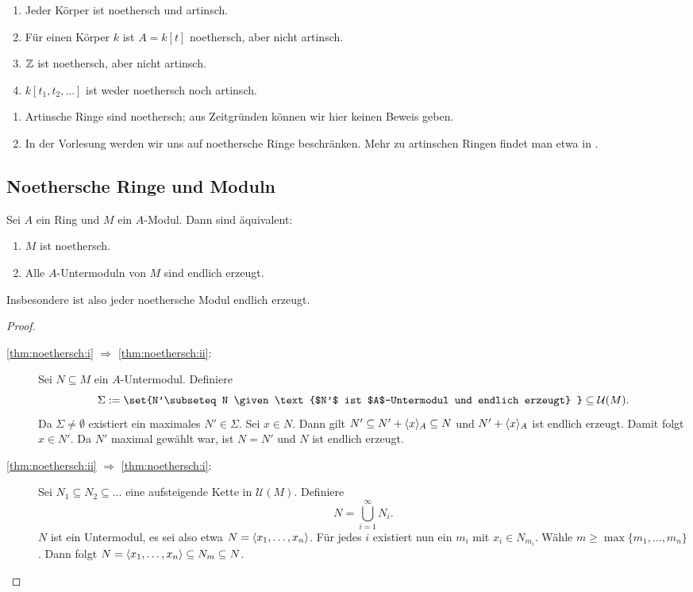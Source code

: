 \documentclass[12pt,a4paper]{scrartcl}
\theoremstyle{cplain}
\theoremstyle{cdef}
\begin{document}
\begin{bsp}
	\leavevmode
	\begin{enumerate}
		\item Jeder Körper ist noethersch und artinsch.
		\item Für einen Körper $k$ ist $A = k[t]$ noethersch, aber nicht artinsch.
		\item $\mathbb Z$ ist noethersch, aber nicht artinsch.
		\item $k[t_1,t_2,\dots]$ ist weder noethersch noch artinsch.
	\end{enumerate}
\end{bsp}
\begin{bem}
	\leavevmode
	\begin{enumerate}
		\item Artinsche Ringe sind noethersch; aus Zeitgründen können wir hier keinen Beweis geben.
		\item In der Vorlesung werden wir uns auf noethersche Ringe beschränken. Mehr zu artinschen Ringen findet man etwa in \cite[Kapitel 8]{atiyah-macdonald}.
	\end{enumerate}
\end{bem}
\subsection{Noethersche Ringe und Moduln}
\begin{satz}\label{thm:noethersch}
	Sei $A$ ein Ring und $M$ ein $A$-Modul. Dann sind äquivalent:
	\begin{enumerate}
		\item $M$ ist noethersch. \label{thm:noethersch:i}
		\item Alle $A$-Untermoduln von $M$ sind endlich erzeugt. \label{thm:noethersch:ii}
	\end{enumerate}
	Insbesondere ist also jeder noethersche Modul endlich erzeugt.
\end{satz}
\begin{proof}
	\leavevmode
	\begin{description}
		\item[\ref{thm:noethersch:i} $\Rightarrow$ \ref{thm:noethersch:ii}:] Sei $N\subseteq M$ ein $A$-Untermodul. Definiere \[\Sigma := \set{N'\subseteq N \given \text{$N'$ ist $A$-Untermodul und endlich erzeugt} }\subseteq \mathcal{U}(M).\]
		Da $\Sigma \neq \emptyset$ existiert ein maximales $N'\in \Sigma$. Sei $x\in N$. Dann gilt $N'\subseteq N'+\langle x\rangle_A\subseteq N$ und $N'+\langle x\rangle_A$ ist endlich erzeugt. Damit folgt $x\in N'$. Da $N'$ maximal gewählt war, ist $N = N'$ und $N$ ist endlich erzeugt.
		\item[\ref{thm:noethersch:ii} $\Rightarrow$ \ref{thm:noethersch:i}:] Sei $N_1\subseteq N_2\subseteq \dots$ eine aufsteigende Kette in $\mathcal{U}(M)$. Definiere
		\[N = \bigcup\limits_{i = 1}^{\infty}N_i.\]
		$N$ ist ein Untermodul, es sei also etwa $N = \langle x_1,\dots, x_n\rangle$. Für jedes $i$ existiert nun ein $m_i$ mit $x_i \in N_{m_i}$. Wähle $m\ge \max\{m_1,\dots, m_n\}$. Dann folgt
		$N = \langle x_1,\dots, x_n\rangle\subseteq N_m\subseteq N$.
		\qedhere
	\end{description}
\end{proof}
\end{document}
